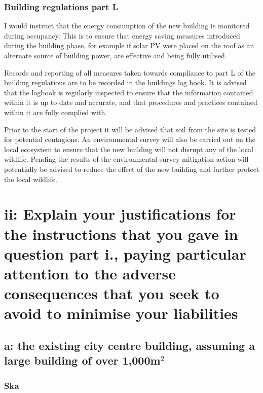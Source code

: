 \documentclass[a4paper,fleqn]{article}
\let\stdsection\section
\renewcommand{\section}{\newpage\stdsection}
\begin{document}


\subsubsection*{Building regulations part L}




I would instruct that the energy consumption of the new building is monitored during occupancy. This is to 
ensure that energy saving measures introduced during the building phase, for example if solar PV were placed 
on the roof as an alternate source of building power, are effective and being fully utilised.

Records and reporting of all measures taken towards compliance to part L of the building regulations are to be 
recorded in the buildings log book. It is advised that the logbook is regularly inspected to ensure that the 
information contained within it is up to date and accurate, and that procedures and practices contained within 
it are fully complied with.

Prior to the start of the project it will be advised that soil from the site is tested for potential contagions. 
An environmental survey will also be carried out on the local ecosystem to ensure that the new building will 
not disrupt any of the local wildlife. Pending the results of the environmental survey mitigation action will 
potentially be advised to reduce the effect of the new building and further protect the local wildlife.


\section*{ii: Explain your justifications for the instructions that you gave in question part i.,
	paying particular attention to the adverse consequences that you seek to avoid to
	minimise your liabilities}


\subsection*{a: the existing city centre building, assuming a large building of over 1,000m$^2$}
\subsubsection*{Ska}
\end{document}
